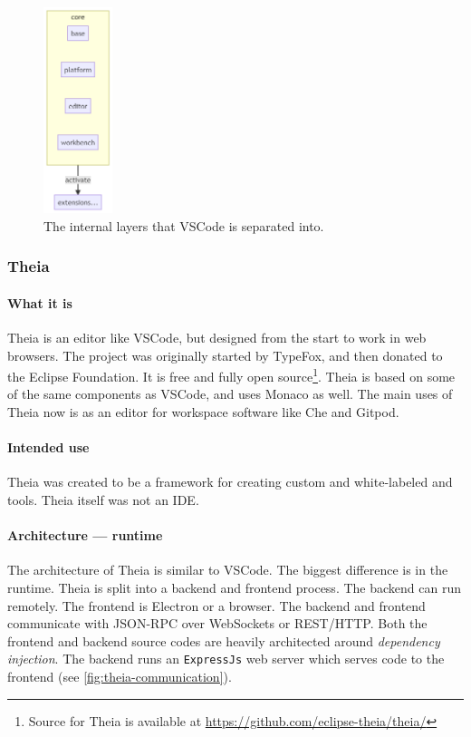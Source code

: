 \begin{figure}[htbp]  %
  \centering
  \includegraphics[width=2cm]{figures/vscode-layers-architecture}
  \caption[VSCode Layers]{The internal layers that VSCode is separated into.~\cite{benjaminpaseroSourceCodeOrganization2020}}\label{fig:vscode-layers-architecture}
\end{figure}



\subsubsection{Theia}\label{sec:theia}

\paragraph*{What it is}
\Gls{Theia} is an editor like \gls{VSCode}, but designed from the start to work in web browsers.
The project was originally started by TypeFox, and then donated to the Eclipse Foundation.
It is free and fully \gls{open source}\footnote{Source for Theia is available at \href{https://github.com/eclipse-theia/theia/}{https://github.com/eclipse-theia/theia/}}.
\Gls{Theia} is based on some of the same components as \gls{VSCode}, and uses Monaco as well.
The main uses of Theia now is as an editor for workspace software like \gls{Che} and \gls{Gitpod}.

\paragraph*{Intended use}
\Gls{Theia} was created to be a framework for creating custom and
white-labeled  and tools. Theia itself was not an IDE.~\cite{helmingEclipseTheiaIDE2019}

\paragraph*{Architecture --- runtime}
The architecture of Theia is similar to \gls{VSCode}.
The biggest difference is in the runtime.
\Gls{Theia} is split into a backend and frontend process. 
The backend can run remotely. 
The frontend is \gls{Electron} or a browser.
The backend and frontend communicate with \gls{JSON-RPC} over \glspl{WebSocket} or \gls{REST}/HTTP.
Both the frontend and backend source codes are heavily architected around
\emph{dependency injection}.
The backend runs an \texttt{ExpressJs} web server which serves code to the frontend (see \cref{fig:theia-communication}).~\cite{typefoxArchitectureOverview}

